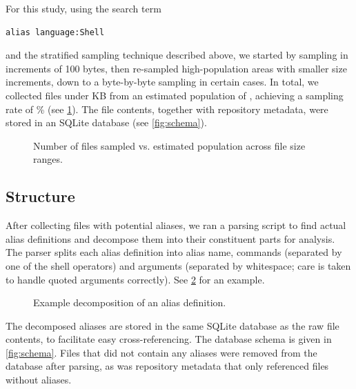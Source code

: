 For this study, using the search term
\begin{verbatim}
alias language:Shell
\end{verbatim}
and the stratified sampling technique described above, we started by sampling in increments of 100 bytes, then re-sampled high-population areas with smaller size increments, down to a byte-by-byte sampling in certain cases.
In total, we collected \TODO files under \TODO KB from an estimated population of \TODO, achieving a sampling rate of \TODO\% (see \cref{fig:sampling}).
The file contents, together with repository metadata, were stored in an SQLite database (see \cref{fig:schema}).

\begin{figure}
    \centering
    \TODO
    \caption{Number of files sampled vs. estimated population across file size ranges.}
    \label{fig:sampling}
\end{figure}


\subsection{Structure}

After collecting files with potential aliases, we ran a parsing script to find actual alias definitions and decompose them into their constituent parts for analysis.
The parser splits each alias definition into alias name, commands (separated by one of the shell operators) and arguments (separated by whitespace; care is taken to handle quoted arguments correctly).
See \cref{fig:parser} for an example.

\begin{figure}
    \centering
    \TODO
    \caption{Example decomposition of an alias definition.}
    \label{fig:parser}
\end{figure}

The decomposed aliases are stored in the same SQLite database as the raw file contents, to facilitate easy cross-referencing.
The database schema is given in \cref{fig:schema}.
Files that did not contain any aliases were removed from the database after parsing, as was repository metadata that only referenced files without aliases.

